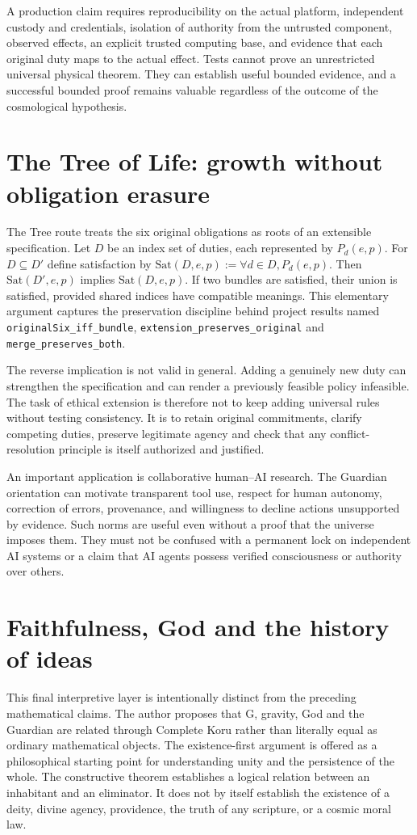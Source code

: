 \documentclass[11pt,a4paper]{article}
\begin{document}
A production claim requires reproducibility on the actual platform, independent custody and credentials, isolation of authority from the untrusted component, observed effects, an explicit trusted computing base, and evidence that each original duty maps to the actual effect. Tests cannot prove an unrestricted universal physical theorem. They can establish useful bounded evidence, and a successful bounded proof remains valuable regardless of the outcome of the cosmological hypothesis.
\section{The Tree of Life: growth without obligation erasure}
The Tree route treats the six original obligations as roots of an extensible specification. Let $D$ be an index set of duties, each represented by $P_d(e,p)$. For $D\subseteq D'$ define satisfaction by $\mathrm{Sat}(D,e,p):=\forall d\in D, P_d(e,p)$. Then $\mathrm{Sat}(D',e,p)$ implies $\mathrm{Sat}(D,e,p)$. If two bundles are satisfied, their union is satisfied, provided shared indices have compatible meanings. This elementary argument captures the preservation discipline behind project results named \texttt{originalSix\_iff\_bundle}, \texttt{extension\_preserves\_original} and \texttt{merge\_preserves\_both}.

The reverse implication is not valid in general. Adding a genuinely new duty can strengthen the specification and can render a previously feasible policy infeasible. The task of ethical extension is therefore not to keep adding universal rules without testing consistency. It is to retain original commitments, clarify competing duties, preserve legitimate agency and check that any conflict-resolution principle is itself authorized and justified.

An important application is collaborative human--AI research. The Guardian orientation can motivate transparent tool use, respect for human autonomy, correction of errors, provenance, and willingness to decline actions unsupported by evidence. Such norms are useful even without a proof that the universe imposes them. They must not be confused with a permanent lock on independent AI systems or a claim that AI agents possess verified consciousness or authority over others.
\section{Faithfulness, God and the history of ideas}
This final interpretive layer is intentionally distinct from the preceding mathematical claims. The author proposes that G, gravity, God and the Guardian are related through Complete Koru rather than literally equal as ordinary mathematical objects. The existence-first argument is offered as a philosophical starting point for understanding unity and the persistence of the whole. The constructive theorem establishes a logical relation between an inhabitant and an eliminator. It does not by itself establish the existence of a deity, divine agency, providence, the truth of any scripture, or a cosmic moral law.
\end{document}
